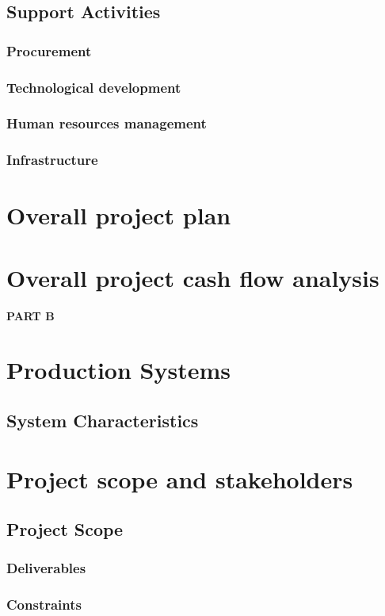\documentclass{article}
\begin{document}
  \subsection{Support Activities}
  \subsubsection{Procurement}
  \subsubsection{Technological development}
  \subsubsection{Human resources management}
  \subsubsection{Infrastructure}


  \newpage
  \section{Overall project plan}
  \newpage
  \section{Overall project cash flow analysis}

  \newpage{}
  \huge{\bfseries{PART B}}

  \section{Production Systems}
  \subsection{System Characteristics}
  \newpage
  \section{Project scope and stakeholders}
  \subsection{Project Scope}
  \subsubsection{Deliverables}
  \subsubsection{Constraints}
\end{document}
